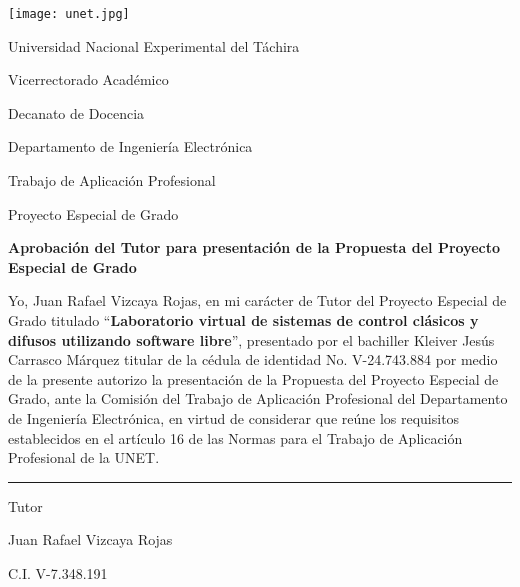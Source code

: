 \begin{titlepage}
\setcounter{page}{4}
\setlength{\parindent}{1.5cm}					%
\setlength{\parskip}{0pt}	

\begin{center}
	\begin{spacing}{1.5}
	\texttt{[image: unet.jpg]}
	
	Universidad Nacional Experimental del Táchira 
	
	Vicerrectorado Académico
	
	Decanato de Docencia
	
	Departamento de Ingeniería Electrónica
	
	Trabajo de Aplicación Profesional
	
	Proyecto Especial de Grado
	\end{spacing}
\end{center}

\vspace{0.5cm}

\begin{center}
		
		\textbf{Aprobación del Tutor para presentación de la Propuesta del Proyecto Especial de Grado}
		
\end{center}

\vspace{0.5cm}

\begin{spacing}{1.5}
	Yo, Juan Rafael Vizcaya Rojas, en mi carácter de Tutor del Proyecto Especial de Grado titulado \enquote{\textbf{Laboratorio virtual de sistemas de control clásicos y difusos utilizando software libre}}, presentado por el bachiller Kleiver Jesús Carrasco Márquez titular de la cédula de identidad No. \mbox{V-24.743.884} por medio de la presente autorizo la presentación de la Propuesta del Proyecto Especial de Grado, ante la Comisión del Trabajo de Aplicación Profesional del Departamento de Ingeniería Electrónica, en virtud de considerar que reúne los requisitos establecidos en el artículo 16 de las Normas para el Trabajo de Aplicación Profesional de la UNET.
\end{spacing}

\vfill

\begin{center}
	
	\rule{6cm}{1pt}
	
	\vspace{0.2cm}
	
	Tutor
	
	Juan Rafael Vizcaya Rojas
	
	\setlength{\parskip}{0pt}
	
	C.I. V-7.348.191
\end{center}

\vspace{0.5cm}
\end{titlepage}